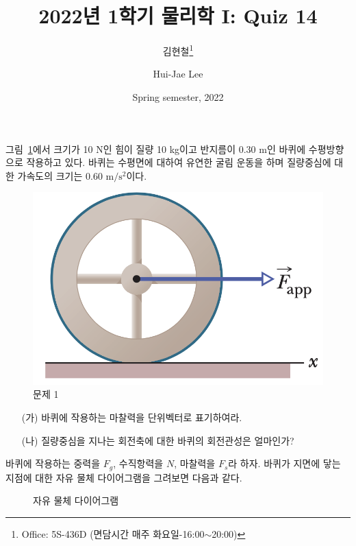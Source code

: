 \documentclass[floatfix,nofootinbib,superscriptaddress,fleqn]{revtex4-2}
\begin{document}
\title{\Large 2022년 1학기 물리학 I: Quiz 14}
\author{김현철\footnote{Office: 5S-436D (면담시간 매주
    화요일-16:00$\sim$20:00)}} 
\author{Hui-Jae Lee} 
\date{Spring semester, 2022}

\vspace{1.cm}

\maketitle

그림~\ref{fig:1}에서 크기가 10 N인 힘이 질량 10 kg이고 반지름이 0.30
m인 바퀴에 수평방향으로 작용하고 있다. 바퀴는 수평면에 대하여 유연한
굴림 운동을 하며 질량중심에 대한 가속도의 크기는 0.60
$\mathrm{m/s^2}$이다. 
\begin{figure}[htp]
  \centering
\includegraphics[scale=0.5]{Qfig14-1-20220427.png}
  \caption{문제 1}
  \label{fig:1}
\end{figure}
\begin{itemize}
\item[(가)] 바퀴에 작용하는 마찰력을 단위벡터로 표기하여라.
\item[(나)] 질량중심을 지나는 회전축에 대한 바퀴의 회전관성은
  얼마인가?   
\end{itemize}

바퀴에 작용하는 중력을 $F_g$, 수직항력을 $N$, 마찰력을 $F_s$라 하자.
바퀴가 지면에 닿는 지점에 대한 자유 물체 다이어그램을 그려보면 다음과 같다.
\begin{figure}[htp]
  \centering
  \caption{자유 물체 다이어그램}
\end{figure}
\end{document}
